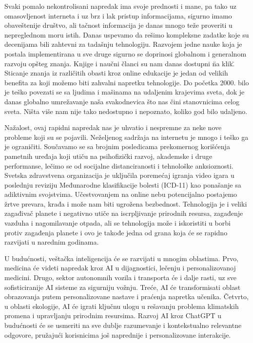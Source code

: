 \documentclass[a4paper]{article}
\begin{document}
{Svaki pomalo nekontrolisani napredak ima svoje prednosti i mane, pa tako uz omasovljenost interneta i uz brz i lak pristup informacijama, sigurno imamo obaveštenije društvo, ali tačnost informacija je danas mnogo teže proveriti u nepreglednom moru istih. Danas uspevamo da rešimo kompleksne zadatke koje su decenijama bili zahtevni za tadašnju tehnologiju. Razvojem jedne nauke koja je postala implementirana u sve druge sigurno se doprinosi globalnom i generalnom razvoju opšteg znanja. Knjige i naučni članci su nam danas dostupni \"na klik\". 
Sticanje znanja iz različitih obasti kroz online edukacije je jedan od velikih benefita za koji možemo biti zahvalni napretku tehnologije.  
Do početka 2000. bilo je teško povezati se sa ljudima i mašinama na udaljenim krajevima sveta, dok je danas globalno umrežavanje naša svakodnevica što nas čini stanovnicima celog sveta. Ništa više nam nije tako nedostupno i nepoznato, koliko god bilo udaljeno.


Nažalost, ovaj rapidni napredak nas je uhvatio i nespremne za neke nove probleme koji su se pojavili. Neželjenog sadržaja na internetu je mnogo i teško ga je ograničiti. Součavamo se sa brojnim posledicama prekomernog korišćenja pametnih uređaja koji utiču na psihofizički razvoj, akademske i druge performanse, lečimo se od socijalne distanciranosti i tehnološke anksioznosti.  \cite{techanx} Svetska zdravstvena organizacija je uključila poremećaj igranja video igara u poslednju reviziju Međunarodne klasifikacije bolesti (ICD-11) kao ponašanje sa adiktivnim svojstvima. \cite{gamingdisorder} 
Učestvovanjem na online nebu potencijalno postajemo žrtve prevara, krađa i može nam biti ugrožena bezbednost. Tehnologija je i veliki zagađivač planete i negativno utiče na iscrpljivanje prirodnih resursa, zagađenje vazduha i nagomilavanje otpada, ali se tehnologija može i iskoristiti u borbi protiv zagađenja planete i ovo je takođe jedna od grana koja će se rapidno razvijati u narednim godinama. \cite{pollution}



U budućnosti, veštačka inteligencija će se razvijati u mnogim oblastima. Prvo, medicina će videti napredak kroz AI u dijagnostici, lečenju i personalizovanoj medicini. Drugo, sektor autonomnih vozila i transporta će i dalje rasti, uz sve sofisticiranije AI sisteme za sigurniju vožnju. Treće, AI će transformisati oblast obrazovanja putem personalizovane nastave i praćenja napretka učenika. Četvrto, u oblasti ekologije, AI će igrati ključnu ulogu u rešavanju problema klimatskih promena i upravljanju prirodnim resursima. Razvoj AI kroz ChatGPT u budućnosti će se usmeriti na sve dublje razumevanje i kontekstualno relevantne odgovore, pružajući korisnicima još naprednije i personalizovane interakcije.

}
\end{document}
